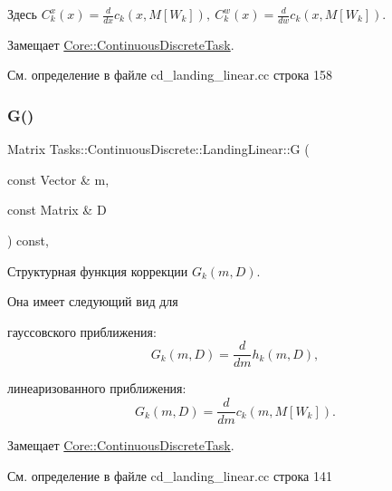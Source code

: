 Здесь $C_k^x(x) = \frac{d}{dx} c_k(x, M[W_k]),\ C_k^w(x) = \frac{d}{dw} c_k(x, M[W_k])$. 

Замещает \hyperlink{class_core_1_1_continuous_discrete_task_a08947ea4d4eb819e0e8530e682a1a377}{Core\+::\+Continuous\+Discrete\+Task}.



См. определение в файле cd\+\_\+landing\+\_\+linear.\+cc строка 158

\hypertarget{class_tasks_1_1_continuous_discrete_1_1_landing_linear_a3b589b0ac53f7fe936438bc7c82f5c3d}{}\label{class_tasks_1_1_continuous_discrete_1_1_landing_linear_a3b589b0ac53f7fe936438bc7c82f5c3d} 
\subsubsection{\texorpdfstring{G()}{G()}}
{\footnotesize\ttfamily Matrix Tasks\+::\+Continuous\+Discrete\+::\+Landing\+Linear\+::G (\begin{DoxyParamCaption}\item[{const Vector \&}]{m,  }\item[{const Matrix \&}]{D }\end{DoxyParamCaption}) const\hspace{0.3cm}{\ttfamily [override]}, {\ttfamily [virtual]}}



Структурная функция коррекции $G_k(m, D)$. 

Она имеет следующий вид для


\begin{DoxyItemize}
\item гауссовского приближения\+: \[G_k(m, D) = \frac{d}{dm}h_k(m,D),\]
\item линеаризованного приближения\+: \[G_k(m, D) = \frac{d}{dm}c_k(m,M[W_k]).\] 
\end{DoxyItemize}

Замещает \hyperlink{class_core_1_1_continuous_discrete_task_a2bc6d34d112ec0999857f7f9e0f67dda}{Core\+::\+Continuous\+Discrete\+Task}.



См. определение в файле cd\+\_\+landing\+\_\+linear.\+cc строка 141

\hypertarget{class_tasks_1_1_continuous_discrete_1_1_landing_linear_a66480881fd719faddafe5104b548db78}{}\label{class_tasks_1_1_continuous_discrete_1_1_landing_linear_a66480881fd719faddafe5104b548db78} 
